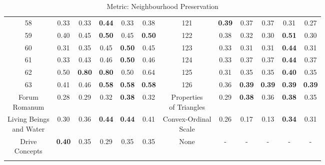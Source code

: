\documentclass{article}
\begin{document}
{\begin{longtable}{cccccc@{\qquad}cccccc}
58 & 0.33 & 0.33 & \textbf{0.44} & 0.33 & 0.38 & 121 & \textbf{0.39} & 0.37 & 0.37 & 0.31 & 0.27 \\
59 & 0.40 & 0.45 & \textbf{0.50} & 0.45 & \textbf{0.50} & 122 & 0.38 & 0.32 & 0.30 & \textbf{0.51} & 0.30 \\
60 & 0.31 & 0.35 & 0.45 & \textbf{0.50} & 0.45 & 123 & 0.33 & 0.31 & 0.31 & \textbf{0.44} & 0.31 \\
61 & 0.33 & 0.43 & 0.46 & \textbf{0.50} & 0.46 & 124 & 0.33 & 0.37 & 0.37 & \textbf{0.44} & 0.37 \\
62 & 0.50 & \textbf{0.80} & \textbf{0.80} & 0.50 & 0.64 & 125 & 0.31 & 0.35 & 0.35 & \textbf{0.40} & 0.35 \\
63 & 0.41 & 0.46 & \textbf{0.58} & \textbf{0.58} & \textbf{0.58} & 126 & 0.36 & \textbf{0.39} & \textbf{0.39} & \textbf{0.39} & \textbf{0.39} \\
\makecell[c]{Forum \\ Romanum} & 0.28 & 0.29 & 0.32 & \textbf{0.38} & 0.32 & \makecell[c]{Properties \\ of Triangles} & 0.29 & \textbf{0.38} & 0.36 & \textbf{0.38} & 0.35 \\
\makecell[c]{Living Beings \\ and Water} & 0.30 & 0.36 & \textbf{0.44} & \textbf{0.44} & 0.41 & \makecell[c]{Convex-Ordinal \\ Scale} & 0.26 & 0.17 & 0.13 & \textbf{0.34} & 0.31 \\
\makecell[c]{Drive \\ Concepts} & \textbf{0.40} & 0.35 & 0.29 & 0.35 & 0.35 & None & - & - & - & - & - \\
\caption{Metric: Neighbourhood Preservation} \\
\end{longtable}
}
\clearpage
\end{document}
